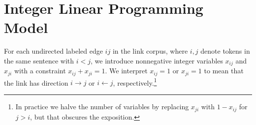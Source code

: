 \documentclass[11pt]{article}
\newcommand{\Note}[4][]{\todo[author=#2,color=#3,fancyline,#1]{#4}}
\newcommand{\noteJH}[2][]{\Note[#1]{JH}{blue!40}{#2}}
\begin{document}

%  


\section{Integer Linear Programming Model}

For each undirected labeled edge $ij$ in the link corpus, where $i,j$ denote tokens in the same sentence with $i < j$, we introduce nonnegative integer variables $x_{ij}$ and $x_{ji}$ with a constraint $x_{ij}+x_{ji}=1$.  We interpret $x_{ij}=1$ or $x_{ji}=1$ to mean that the link has direction $i \rightarrow j$ or $i \leftarrow j$, respectively.\footnote{In practice we halve the number of variables by replacing $x_{ji}$ with $1-x_{ij}$ for $j > i$, but that obscures the exposition.}

\end{document}
